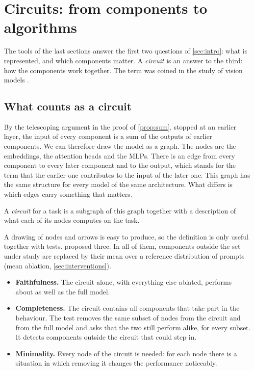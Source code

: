 \section{Circuits: from components to algorithms}
\label{sec:circuits}

The tools of the last sections answer the first two questions of \cref{sec:intro}: what is represented, and
which components matter. A \emph{circuit} is an answer to the third: how the components work together. The term was coined in the study
of vision models \citep{olah2020zoom}.

\subsection{What counts as a circuit}

By the telescoping argument in the proof of \cref{prop:sum}, stopped at an earlier layer, the input of every
component is a sum of the outputs of earlier components. We can
therefore draw the model as a graph. The nodes are the embeddings, the attention heads and the MLPs. There is
an edge from every component to every later component and to the output, which stands for the term that the
earlier one contributes to the input of the later one. This graph has the same structure for every model of
the same architecture. What differs is which edges carry something that matters.

\begin{definition}[Circuit]\label{def:circuit}
A \emph{circuit} for a task is a subgraph of this graph together with a description of what each of its nodes
computes on the task.
\end{definition}

A drawing of nodes and arrows is easy to produce, so the definition is only useful together with tests.
\citet{wang2023interpretability} proposed three. In all of them, components outside the set under study are
replaced by their mean over a reference distribution of prompts (mean ablation, \cref{sec:interventions}).
\begin{itemize}
\item \textbf{Faithfulness.} The circuit alone, with everything else ablated, performs about as well as the
full model.
\item \textbf{Completeness.} The circuit contains all components that take part in the behaviour. The test
removes the same subset of nodes from the circuit and from the full model and asks that the two still perform
alike, for every subset. It detects components outside the circuit that could step in.
\item \textbf{Minimality.} Every node of the circuit is needed: for each node there is a situation in which
removing it changes the performance noticeably.
\end{itemize}

